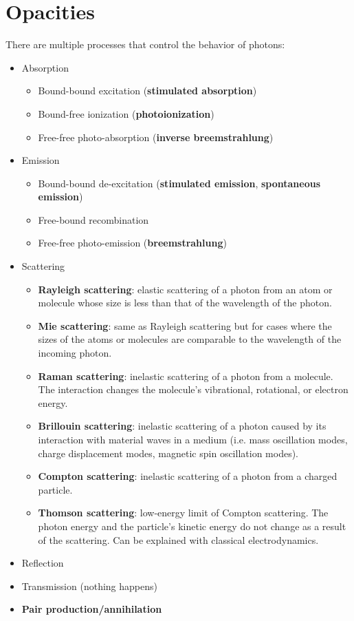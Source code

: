 \documentclass[a4paper,11pt]{article}
\begin{document}
\section{Opacities}
There are multiple processes that control the behavior of photons:
\begin{itemize}
    \item Absorption 
    \begin{itemize}
        \item Bound-bound excitation (\textbf{stimulated absorption})
        \item Bound-free ionization (\textbf{photoionization})
        \item Free-free photo-absorption (\textbf{inverse breemstrahlung})
    \end{itemize}
    \item Emission 
    \begin{itemize}
        \item Bound-bound de-excitation (\textbf{stimulated emission}, \textbf{spontaneous emission})
        \item Free-bound recombination
        \item Free-free photo-emission (\textbf{breemstrahlung})
    \end{itemize}
    \item Scattering
    \begin{itemize}
        \item \textbf{Rayleigh scattering}: elastic scattering of a photon from an atom or molecule whose size is less than that of the wavelength of the photon. 
        \item \textbf{Mie scattering}: same as Rayleigh scattering but for cases where the sizes of the atoms or molecules are comparable to the wavelength of the incoming photon.
        \item \textbf{Raman scattering}: inelastic scattering of a photon from a molecule. The interaction changes the molecule's vibrational, rotational, or electron energy.
        \item \textbf{Brillouin scattering}: inelastic scattering of a photon caused by its interaction with material waves in a medium (i.e. mass oscillation modes, charge displacement modes, magnetic spin oscillation modes). 
        \item \textbf{Compton scattering}: inelastic scattering of a photon from a charged particle. 
        \item \textbf{Thomson scattering}: low-energy limit of Compton scattering. The photon energy and the particle's kinetic energy do not change as a result of the scattering. Can be explained with classical electrodynamics.
    \end{itemize}
    \item Reflection
    \item Transmission (nothing happens)
    \item \textbf{Pair production/annihilation}
\end{itemize}
\end{document}
